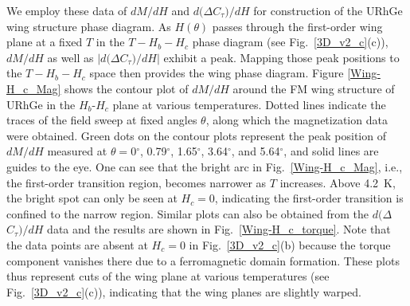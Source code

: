 \documentclass[twocolumn, aps, superscriptaddress, amsfonts,floatfix]{revtex4}%
\begin{document}
{We employ these data of $dM/dH$ and $d(\Delta$$C_{\tau})$$/dH$ for construction of the URhGe wing structure phase diagram. As $H(\theta)$ passes through the first-order wing plane at a fixed $T$ in the $T-H_b-H_c$ phase diagram (see Fig.~\ref{3D_v2_c}(c)), $dM/dH$ as well as $|d(\Delta$$C_{\tau})$$/dH|$ exhibit a peak. Mapping those peak positions to the $T-H_b-H_c$ space then provides the wing phase diagram. 
Figure \ref{Wing-H_c_Mag} shows the contour plot of $dM/dH$ around the FM wing structure of  URhGe in the $H_b$-$H_c$ plane  at various temperatures.
Dotted lines indicate the traces of the field sweep at fixed angles $\theta$, along which the magnetization data were obtained. 
Green dots on the contour plots represent the peak position of $dM/dH$ measured at $\theta = 0$$^\circ$, 0.79$^\circ$, 1.65$^\circ$, 3.64$^\circ$, and 5.64$^\circ$, and solid lines are guides to the eye.
One can see that the bright arc in  Fig.~\ref{Wing-H_c_Mag}, i.e., the first-order transition region, becomes narrower as $T$ increases. Above 4.2~K, the bright spot can only be seen at $H_c=0$, indicating the first-order transition is confined to the narrow region. Similar plots can also be obtained from the $d(\Delta$$C_{\tau})$$/dH$ data and the results are shown in Fig.~\ref{Wing-H_c_torque}. 
Note that the data points are absent at $H_c=0$ in Fig.~\ref{3D_v2_c}(b) because the torque component vanishes there due to a ferromagnetic domain formation. 
These plots thus represent cuts of the wing plane at various temperatures (see Fig.~\ref{3D_v2_c}(c)), indicating that the wing planes are slightly warped. 

}
\end{document}
